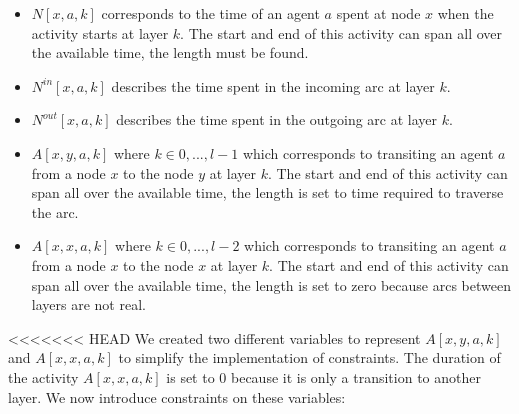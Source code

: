 \documentclass[12pt, a4paper, hidelinks]{article}
\numberwithin{equation}{section}
\begin{document}
\begin{itemize}
\item $N[x,a,k]$ corresponds to the time of an agent $a$ spent at node $x$ when the activity starts at layer $k$. The start and end of this activity can span all over the available time, the length must be found.
\item $N^{in}[x,a,k]$ describes the time spent in the incoming arc at layer $k$.
\item $N^{out}[x,a,k]$ describes the time spent in the outgoing arc at layer $k$.
\item $A[x,y,a,k]$ where $k \in {0,...,l-1}$ which corresponds to transiting an agent $a$ from a node $x$ to the node $y$ at layer $k$. The start and end of this activity can span all over the available time, the length is set to time required to traverse the arc.
\item $A[x,x,a,k]$ where $k \in {0,...,l-2}$ which corresponds to transiting an agent $a$ from a node $x$ to the node $x$ at layer $k$. The start and end of this activity can span all over the available time, the length is set to zero because arcs between layers are not real.
\end{itemize}

<<<<<<< HEAD
We created two different variables to represent $A[x,y,a,k]$ and $A[x,x,a,k]$ to simplify the implementation of constraints. The duration of the activity $A[x,x,a,k]$ is set to 0 because it is only a transition to another layer. 
We now introduce constraints on these variables:
\end{document}
